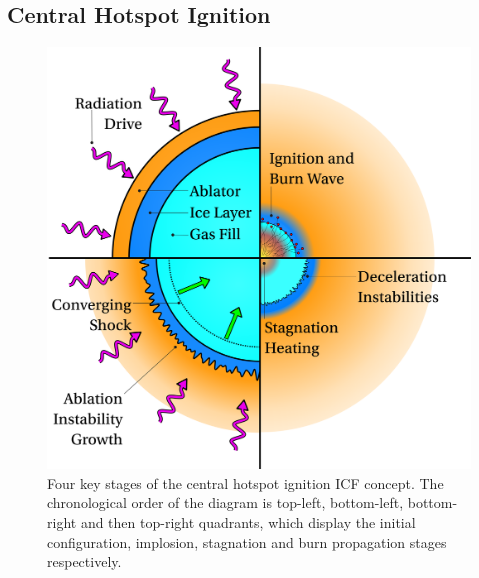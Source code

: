 \subsection{Central Hotspot Ignition}%
\label{sec:intro_centralhotspot}

\begin{figure}[t!]
    \includegraphics[width=0.7\linewidth]{Introduction/Images/hotspot ignition white.png}
    \centering
    \caption{Four key stages of the central hotspot ignition \ac{ICF} concept.
    The chronological order of the diagram is top-left, bottom-left, bottom-right and then top-right quadrants, which display the initial configuration, implosion, stagnation and burn propagation stages respectively.
    }%
    \label{fig:intro_hotspot}
\end{figure}

